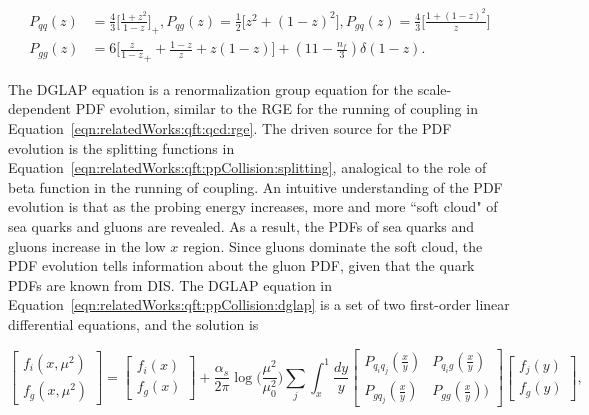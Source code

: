\begin{equation}
\begin{split}
	P_{qq}(z) &= \frac{4}{3}\bigg[\frac{1+z^2}{1-z} \bigg]_+, P_{qg}(z)=\frac{1}{2} \bigg[z^2+(1-z)^2 \bigg], P_{gq}(z)=\frac{4}{3}\bigg[\frac{1+(1-z)^2}{z} \bigg]\\
    P_{gg}(z) &= 6 \bigg[ \frac{z}{1-z}_+ + \frac{1-z}{z} + z(1-z) \bigg] +(11-\frac{n_f}{3})\delta(1-z) .
\end{split}
\label{eqn:relatedWorks:qft:ppCollision:splitting}
\end{equation}

\noindent The DGLAP equation is a renormalization group equation for the scale-dependent PDF evolution, similar to the RGE for the running of coupling in Equation~\ref{eqn:relatedWorks:qft:qcd:rge}. The driven source for the PDF evolution is the splitting functions in Equation~\ref{eqn:relatedWorks:qft:ppCollision:splitting}, analogical to the role of beta function in the running of coupling.  An intuitive understanding of the PDF evolution is that as the probing energy increases, more and more ``soft cloud" of sea quarks and gluons are revealed. As a result, the PDFs of sea quarks and gluons increase in the low $x$ region. Since gluons dominate the soft cloud, the PDF evolution tells information about the gluon PDF, given that the quark PDFs are known from DIS. The DGLAP equation in Equation~\ref{eqn:relatedWorks:qft:ppCollision:dglap} is a set of two first-order linear differential equations, and the solution is

\begin{equation}
    \begin{bmatrix} f_i(x,\mu^2) \\ f_g(x,\mu^2) \end{bmatrix} = \begin{bmatrix} f_i(x) \\ f_g(x) \end{bmatrix} + 
    \frac{\alpha_s}{2\pi} \log\bigg(\frac{\mu^2}{\mu_0^2}\bigg) 
    \sum_j \int_x^1 
    \frac{dy}{y}
    \begin{bmatrix} P_{q_i q_j}(\frac{x}{y}) & P_{q_i g}(\frac{x}{y}) \\ P_{g q_j}(\frac{x}{y}) & P_{gg}(\frac{x}{y})) \end{bmatrix} \begin{bmatrix} f_j(y) \\ f_g(y) \end{bmatrix}  , 
\end{equation}


